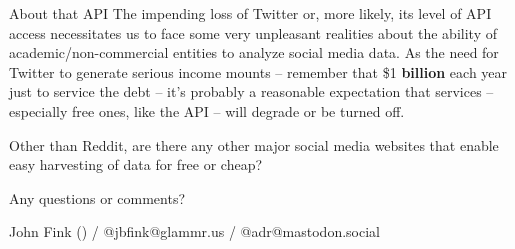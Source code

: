 \documentclass{beamer}
\begin{document}
\begin{frame}{About that API}
	The impending loss of Twitter or, more likely, its level of API access necessitates us to face some very unpleasant realities about the ability of academic/non-commercial entities to analyze social media data. As the need for Twitter to generate serious income mounts -- remember that \$1 \textbf{billion} each year just to service the debt -- it's probably a reasonable expectation that services -- especially free ones, like the API -- will degrade or be turned off.
	\newline
	
	Other than Reddit, are there any other major social media websites that enable easy harvesting of data for free or cheap?
\end{frame}

\begin{frame}
	Any questions or comments?
	
	John Fink  () / @jbfink@glammr.us / @adr@mastodon.social
\end{frame}
\end{document}
